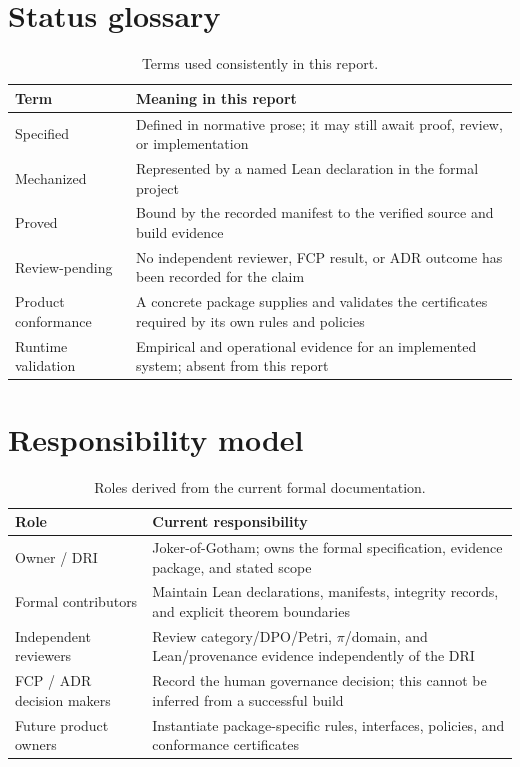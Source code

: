 \label{app:status}

\section{Status glossary}

\begin{table}[H]
\centering
\caption{Terms used consistently in this report.}
\begin{tabularx}{\textwidth}{@{}L{0.23\textwidth}Y@{}}
\toprule
{}
\textbf{Term} & \textbf{Meaning in this report} \\
\midrule
Specified & Defined in normative prose; it may still await proof, review, or implementation \\
Mechanized & Represented by a named Lean declaration in the formal project \\
Proved & Bound by the recorded manifest to the verified source and build evidence \\
Review-pending & No independent reviewer, FCP result, or ADR outcome has been recorded for the claim \\
Product conformance & A concrete package supplies and validates the certificates required by its own rules and policies \\
Runtime validation & Empirical and operational evidence for an implemented system; absent from this report \\
\bottomrule
\end{tabularx}
\end{table}

\section{Responsibility model}

\begin{table}[H]
\centering
\caption{Roles derived from the current formal documentation.}
\begin{tabularx}{\textwidth}{@{}L{0.27\textwidth}Y@{}}
\toprule
{}
\textbf{Role} & \textbf{Current responsibility} \\
\midrule
Owner / DRI & Joker-of-Gotham; owns the formal specification, evidence package, and stated scope \\
Formal contributors & Maintain Lean declarations, manifests, integrity records, and explicit theorem boundaries \\
Independent reviewers & Review category/DPO/Petri, \(\pi\)/domain, and Lean/provenance evidence independently of the DRI \\
FCP / ADR decision makers & Record the human governance decision; this cannot be inferred from a successful build \\
Future product owners & Instantiate package-specific rules, interfaces, policies, and conformance certificates \\
\bottomrule
\end{tabularx}
\end{table}

